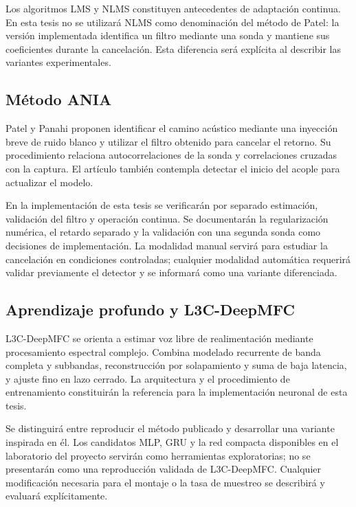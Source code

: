 Los algoritmos LMS y NLMS constituyen antecedentes de adaptación continua. En esta tesis no se utilizará NLMS como denominación del método de Patel: la versión implementada identifica un filtro mediante una sonda y mantiene sus coeficientes durante la cancelación. Esta diferencia será explícita al describir las variantes experimentales.

\subsection{Método ANIA}
Patel y Panahi proponen identificar el camino acústico mediante una inyección breve de ruido blanco y utilizar el filtro obtenido para cancelar el retorno. Su procedimiento relaciona autocorrelaciones de la sonda y correlaciones cruzadas con la captura. El artículo también contempla detectar el inicio del acople para actualizar el modelo\cite{patel2020}.

En la implementación de esta tesis se verificarán por separado estimación, validación del filtro y operación continua. Se documentarán la regularización numérica, el retardo separado y la validación con una segunda sonda como decisiones de implementación. La modalidad manual servirá para estudiar la cancelación en condiciones controladas; cualquier modalidad automática requerirá validar previamente el detector y se informará como una variante diferenciada.

\subsection{Aprendizaje profundo y L3C-DeepMFC}
L3C-DeepMFC se orienta a estimar voz libre de realimentación mediante procesamiento espectral complejo. Combina modelado recurrente de banda completa y subbandas, reconstrucción por solapamiento y suma de baja latencia, y ajuste fino en lazo cerrado\cite{hao2025}. La arquitectura y el procedimiento de entrenamiento constituirán la referencia para la implementación neuronal de esta tesis.

Se distinguirá entre reproducir el método publicado y desarrollar una variante inspirada en él. Los candidatos MLP, GRU y la red compacta disponibles en el laboratorio del proyecto servirán como herramientas exploratorias; no se presentarán como una reproducción validada de L3C-DeepMFC. Cualquier modificación necesaria para el montaje o la tasa de muestreo se describirá y evaluará explícitamente.


